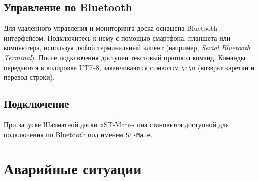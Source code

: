 \documentclass[a4paper,12pt]{article}
\begin{document}
\subsection{Управление по Bluetooth}
Для удалённого управления и мониторинга доска оснащена Bluetooth-интерфейсом. 
Подключитесь к нему с помощью смартфона, планшета или компьютера, используя любой терминальный клиент (например, \textit{Serial Bluetooth Terminal}).
После подключения доступен текстовый протокол команд. 
Команды передаются в кодировке UTF-8, заканчиваются символом \texttt{\textbackslash{r}\textbackslash{n}} (возврат каретки и перевод строки).

\subsection{Подключение}
При запуске Шахматной доски «ST-Mate» она становится доступной для подключения по Bluetooth под именем \texttt{ST-Mate}.

\section{Аварийные ситуации}
\label{sec:troubleshooting}
\end{document}
